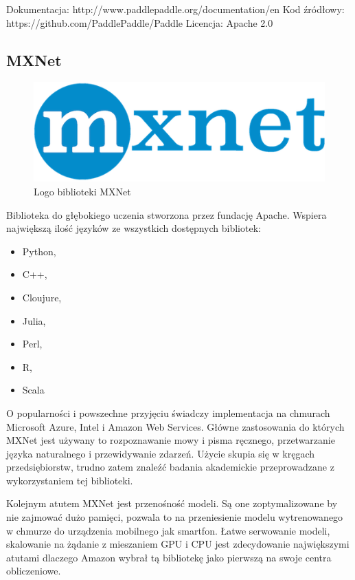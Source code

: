 \documentclass[12pt,a4paper,twoside,titlepage,openright]{book}
\begin{document}
\noindent
\newline
Dokumentacja: http://www.paddlepaddle.org/documentation/en
\newline
Kod źródłowy: https://github.com/PaddlePaddle/Paddle
\newline
Licencja: Apache 2.0

\subsection{MXNet}
\begin{figure}[h]
	\centering
			\includegraphics[resolution=100,scale=2]{MXNet.png}
		\caption{Logo biblioteki MXNet}
\end{figure}

Biblioteka do głębokiego uczenia stworzona przez fundację Apache. Wspiera największą ilość języków ze wszystkich dostępnych bibliotek:
\begin{itemize}
\item Python,
\item C++,
\item Cloujure,
\item Julia,
\item Perl,
\item R,
\item Scala
\end{itemize}

O popularności i powszechne przyjęciu świadczy implementacja na chmurach Microsoft Azure, Intel i Amazon Web Services. Główne zastosowania do których MXNet jest używany to rozpoznawanie mowy i pisma ręcznego, przetwarzanie języka naturalnego i przewidywanie zdarzeń. Użycie skupia się w kręgach przedsiębiorstw, trudno zatem znaleźć badania akademickie przeprowadzane z wykorzystaniem tej biblioteki.

Kolejnym atutem MXNet jest przenośność modeli. Są one zoptymalizowane by nie zajmować dużo pamięci, pozwala to na przeniesienie modelu wytrenowanego w chmurze do urządzenia mobilnego jak smartfon. Łatwe serwowanie modeli, skalowanie na żądanie z mieszaniem GPU i CPU jest zdecydowanie największymi atutami dlaczego Amazon wybrał tą bibliotekę jako pierwszą na swoje centra obliczeniowe. \cite{book:2256184}
\end{document}
